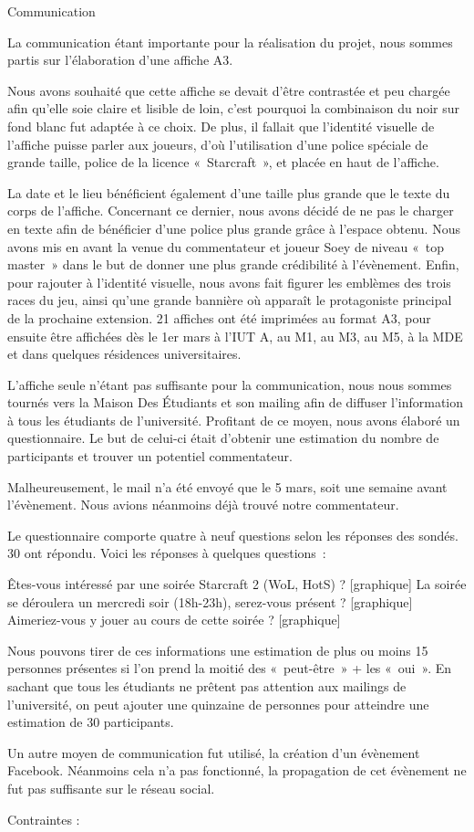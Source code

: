 Communication

	La communication étant importante pour la réalisation du projet, nous sommes partis sur l'élaboration 
d'une affiche A3.

	Nous avons souhaité que cette affiche se devait d’être contrastée et peu chargée afin qu’elle soie 
claire et lisible de loin, c’est pourquoi la combinaison du noir sur fond blanc fut adaptée à ce choix. 
De plus, il fallait que l’identité visuelle de l’affiche puisse parler aux joueurs, d’où l’utilisation 
d’une police spéciale de grande taille, police de la licence « Starcraft », et placée en haut de l’affiche.
	
	La date et le lieu bénéficient également d’une taille plus grande que le texte du corps de l’affiche.
Concernant ce dernier, nous avons décidé de ne pas le charger en texte afin de bénéficier d’une police 
plus grande grâce à l’espace obtenu.
	Nous avons mis en avant la venue du commentateur et joueur Soey  de niveau « top master »  dans le but 
de donner une plus grande crédibilité à l’évènement. 
	Enfin, pour rajouter à l’identité visuelle, nous avons fait figurer  les emblèmes des trois races du jeu, 
ainsi qu’une grande bannière où apparaît le protagoniste principal de la prochaine extension.
21 affiches ont été imprimées au format A3, pour ensuite être affichées dès le 1er mars à l’IUT A, au M1,
au M3, au M5, à la MDE et dans quelques résidences universitaires.

	L’affiche seule n’étant pas suffisante pour la communication, nous nous sommes tournés vers la 
Maison Des Étudiants et son mailing afin de diffuser l’information à tous les étudiants de l’université.
Profitant de ce moyen, nous avons élaboré un questionnaire. Le but de celui-ci était d’obtenir une estimation
du nombre de participants et trouver un potentiel commentateur.
	
	Malheureusement, le mail n’a été envoyé que le 5 mars, soit une semaine avant l’évènement.
Nous avions néanmoins déjà trouvé notre commentateur.

Le questionnaire comporte quatre à neuf questions selon les réponses des sondés. 30 ont répondu.
Voici les réponses à quelques questions :


Êtes-vous intéressé par une soirée Starcraft 2 (WoL, HotS) ?
[graphique]
La soirée se déroulera un mercredi soir (18h-23h), serez-vous présent ?
[graphique]
Aimeriez-vous y jouer au cours de cette soirée ?
[graphique]

	Nous pouvons tirer de ces informations une estimation de plus ou moins 15 personnes présentes si l’on prend
la moitié des « peut-être » + les « oui ». 
	En sachant que tous les étudiants ne prêtent pas attention aux mailings de l’université, on peut ajouter 
une quinzaine de personnes pour atteindre une estimation de 30 participants.

	Un autre moyen de communication fut utilisé, la création d'un évènement Facebook. Néanmoins cela n'a pas fonctionné, 
la propagation de cet évènement ne fut pas suffisante sur le réseau social.


Contraintes :

